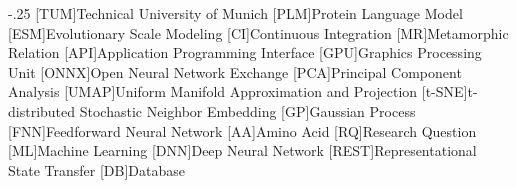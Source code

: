 \documentclass[headsepline,footsepline,footinclude=false,oneside,fontsize=11pt,paper=a4,listof=totoc,bibliography=totoc]{scrbook} %
\begin{document}
%

\frontmatter{}




%

\tableofcontents{}

\mainmatter{}









\appendix{}


\begin{acronym}
	\itemsep-.25\baselineskip
	[TUM]{Technical University of Munich}
	[PLM]{Protein Language Model}
	[ESM]{Evolutionary Scale Modeling}
	[CI]{Continuous Integration}
	[MR]{Metamorphic Relation}
	[API]{Application Programming Interface}
	[GPU]{Graphics Processing Unit}
	[ONNX]{Open Neural Network Exchange}
	[PCA]{Principal Component Analysis}
	[UMAP]{Uniform Manifold Approximation and Projection}
	[t-SNE]{t-distributed Stochastic Neighbor Embedding}
	[GP]{Gaussian Process}
	[FNN]{Feedforward Neural Network}
	[AA]{Amino Acid}
	[RQ]{Research Question}
	[ML]{Machine Learning}
	[DNN]{Deep Neural Network}
	[REST]{Representational State Transfer}
	[DB]{Database}
\end{acronym}

\listoffigures{}
\listoftables{}
\printbibliography{}
\end{document}
